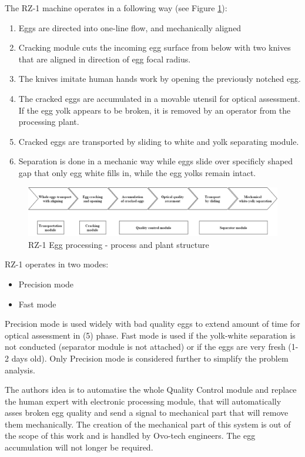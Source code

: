 \documentclass[12pt,twoside,a4paper]{article}
\begin{document}
The RZ-1 machine operates in a following way (see Figure \ref{fig:process}):
\begin{enumerate}
\item Eggs are directed into one-line flow, and mechanically aligned

\item Cracking module cuts the incoming egg surface from below with two knives that are aligned in direction of egg focal radius.
\item The knives imitate human hands work by opening the previously notched egg.
\item The cracked eggs are accumulated in a movable utensil for optical assessment. 
If the egg yolk appears to be broken, it is removed by an operator from the processing plant.
\item Cracked eggs are transported by sliding to white and yolk separating module.
\item Separation  is done in a mechanic way while eggs slide over specificly shaped gap that only egg white fills in, while the egg yolks remain intact.
\end{enumerate}

\begin{figure}[H]
\centering
\includegraphics[width=0.8\paperwidth]{process}
\caption{RZ-1 Egg processing  - process and plant structure}\label{fig:process}

\end{figure}
RZ-1 operates in two modes:
\begin{itemize}
\item Precision mode
\item Fast mode
\end{itemize}
Precision mode is used widely with bad quality eggs to extend amount of time for optical assessment in (5) phase.
Fast mode is used if the yolk-white separation is not conducted (separator module is not attached) or if the eggs are very fresh (1-2 days old).
Only Precision mode is considered further to simplify the problem analysis.

The authors idea is to automatise the whole Quality Control module and replace the human expert with electronic processing module, that will automatically asses broken egg quality and send a signal to mechanical part that will remove them mechanically.
The creation of the mechanical part of this system is out of the scope of this work and is handled by Ovo-tech engineers.
The egg accumulation will not longer be required.
\end{document}
